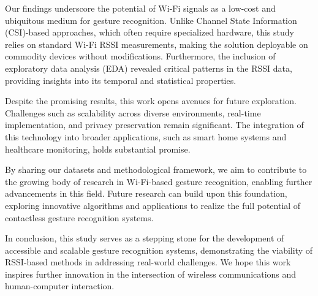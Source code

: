 \documentclass[10pt,twocolumn,letterpaper]{article}
\begin{document}
Our findings underscore the potential of Wi-Fi signals as a low-cost and ubiquitous medium for gesture recognition. Unlike Channel State Information (CSI)-based approaches, which often require specialized hardware, this study relies on standard Wi-Fi RSSI measurements, making the solution deployable on commodity devices without modifications. Furthermore, the inclusion of exploratory data analysis (EDA) revealed critical patterns in the RSSI data, providing insights into its temporal and statistical properties.

Despite the promising results, this work opens avenues for future exploration. Challenges such as scalability across diverse environments, real-time implementation, and privacy preservation remain significant. The integration of this technology into broader applications, such as smart home systems and healthcare monitoring, holds substantial promise.

By sharing our datasets and methodological framework, we aim to contribute to the growing body of research in Wi-Fi-based gesture recognition, enabling further advancements in this field. Future research can build upon this foundation, exploring innovative algorithms and applications to realize the full potential of contactless gesture recognition systems.


In conclusion, this study serves as a stepping stone for the development of accessible and scalable gesture recognition systems, demonstrating the viability of RSSI-based methods in addressing real-world challenges. We hope this work inspires further innovation in the intersection of wireless communications and human-computer interaction.

{\small


}
\end{document}

